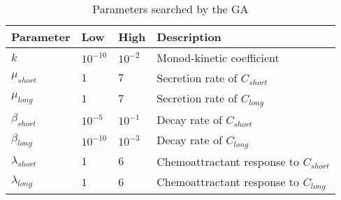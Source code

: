\begin{table}[ht]
    \caption{Parameters searched by the GA} %
    \centering
    \begin{footnotesize}
        \begin{tabular}{l l l l}
            \hline
            Parameter         & Low        & High      & Description
            \\ \hline \hline
            $k$               & $10^{-10}$ & $10^{-2}$ & Monod-kinetic coefficient
            \\
            $\mu_{short}$     & $1$        & $7$       & Secretion rate of
            $C_{short}$           \\
            $\mu_{long}$      & $1$        & $7$       & Secretion rate of $C_{long}$
            \\
            $\beta_{short}$   & $10^{-5}$  & $10^{-1}$ & Decay rate of $C_{short}$
            \\
            $\beta_{long}$    & $10^{-10}$ & $10^{-3}$ & Decay rate of $C_{long}$
            \\
            $\lambda_{short}$ & $1$        & $6$       & Chemoattractant response to
            $C_{short}$ \\
            $\lambda_{long}$  & $1$        & $6$       & Chemoattractant response to
            $C_{long}$  \\
            \hline
        \end{tabular}
    \end{footnotesize}
    \label{unknownparameters}
\end{table}

